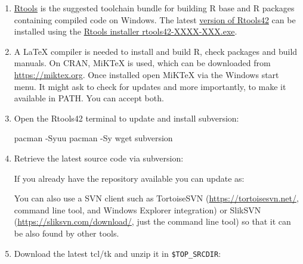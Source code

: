 \documentclass[
]{book}
\newenvironment{Shaded}{\begin{snugshade}}{\end{snugshade}}
\newcommand{\AttributeTok}[1]{\textcolor[rgb]{0.77,0.63,0.00}{#1}}
\newcommand{\BuiltInTok}[1]{#1}
\newcommand{\ExtensionTok}[1]{#1}
\newcommand{\FunctionTok}[1]{\textcolor[rgb]{0.00,0.00,0.00}{#1}}
\newcommand{\NormalTok}[1]{#1}
\newcommand{\OperatorTok}[1]{\textcolor[rgb]{0.81,0.36,0.00}{\textbf{#1}}}
\newcommand{\StringTok}[1]{\textcolor[rgb]{0.31,0.60,0.02}{#1}}
\newcommand{\VariableTok}[1]{\textcolor[rgb]{0.00,0.00,0.00}{#1}}
\begin{document}
\begin{enumerate}
\def\labelenumi{\arabic{enumi}.}
\item
  \href{https://cran.r-project.org/bin/windows/Rtools/}{Rtools} is the suggested toolchain bundle for building R base and R packages containing compiled code on Windows.
  The latest \href{https://cran.r-project.org/bin/windows/Rtools/rtools42/rtools.html}{version of Rtools42} can be installed using the \href{https://cran.r-project.org/bin/windows/Rtools/rtools42/files/}{Rtools installer rtools42-XXXX-XXX.exe}.
\item
  A LaTeX compiler is needed to install and build R, check packages and build manuals.
  On CRAN, MiKTeX is used, which can be downloaded from \url{https://miktex.org}.
  Once installed open MiKTeX via the Windows start menu.
  It might ask to check for updates and more importantly, to make it available in PATH. You can accept both.
\item
  Open the Rtools42 terminal to update and install subversion:

\begin{Shaded}
\begin{Highlighting}[]
\ExtensionTok{pacman} \AttributeTok{{-}Syuu}
\ExtensionTok{pacman} \AttributeTok{{-}Sy}\NormalTok{ wget subversion}
\end{Highlighting}
\end{Shaded}
\item
  Retrieve the latest source code via subversion:

\begin{Shaded}
\end{Shaded}

  If you already have the repository available you can update as:

\begin{Shaded}
\end{Shaded}

  You can also use a SVN client such as TortoiseSVN (\url{https://tortoisesvn.net/}, command line tool, and Windows Explorer integration) or SlikSVN (\url{https://sliksvn.com/download/}, just the command line tool) so that it can be also found by other tools.
\item
  Download the latest tcl/tk and unzip it in \texttt{\$TOP\_SRCDIR}:


\end{enumerate}
\end{document}
